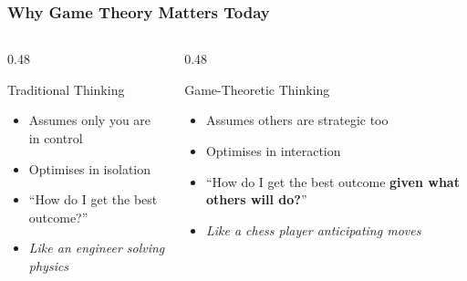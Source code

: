 \begin{frame}[fragile]\frametitle{Why Game Theory Matters Today}
  \begin{columns}
    \begin{column}[T]{0.48\linewidth}
      \begin{block}{Traditional Thinking}
        \begin{itemize}
          \item Assumes only you are in control
          \item Optimises in isolation
          \item ``How do I get the best outcome?''
          \item \textit{Like an engineer solving physics}
        \end{itemize}
      \end{block}

    \end{column}
    \begin{column}[T]{0.48\linewidth}
		\begin{block}{Game-Theoretic Thinking}
        \begin{itemize}
          \item Assumes others are strategic too
          \item Optimises in interaction
          \item ``How do I get the best outcome \textbf{given what others will do?}''
          \item \textit{Like a chess player anticipating moves}
        \end{itemize}
      \end{block}
    \end{column}
  \end{columns}
\end{frame}


